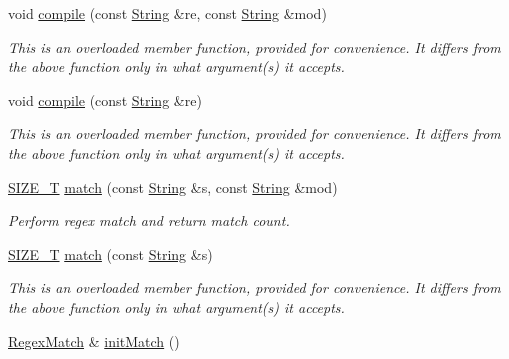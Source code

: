 \begin{DoxyCompactItemize}
void \hyperlink{classjpcre2_1_1Regex_acd49e856009160c622e90b81b6557d8d_acd49e856009160c622e90b81b6557d8d}{compile} (const \hyperlink{namespacejpcre2_a91f03070152fb228bc116c5a737f1d16}{String} \&re, const \hyperlink{namespacejpcre2_a91f03070152fb228bc116c5a737f1d16}{String} \&mod)
\begin{DoxyCompactList}\small\item\em This is an overloaded member function, provided for convenience. It differs from the above function only in what argument(s) it accepts. \end{DoxyCompactList}\item 
void \hyperlink{classjpcre2_1_1Regex_a81687ca434654cae776c2854c3618de0_a81687ca434654cae776c2854c3618de0}{compile} (const \hyperlink{namespacejpcre2_a91f03070152fb228bc116c5a737f1d16}{String} \&re)
\begin{DoxyCompactList}\small\item\em This is an overloaded member function, provided for convenience. It differs from the above function only in what argument(s) it accepts. \end{DoxyCompactList}\item 
\hyperlink{namespacejpcre2_a2aac465ddcb123560c7c8215dd69246c}{S\+I\+Z\+E\+\_\+T} \hyperlink{classjpcre2_1_1Regex_ab93775a93a0a537d09b9e9ab4a5a3894_ab93775a93a0a537d09b9e9ab4a5a3894}{match} (const \hyperlink{namespacejpcre2_a91f03070152fb228bc116c5a737f1d16}{String} \&s, const \hyperlink{namespacejpcre2_a91f03070152fb228bc116c5a737f1d16}{String} \&mod)
\begin{DoxyCompactList}\small\item\em Perform regex match and return match count. \end{DoxyCompactList}\item 
\hyperlink{namespacejpcre2_a2aac465ddcb123560c7c8215dd69246c}{S\+I\+Z\+E\+\_\+T} \hyperlink{classjpcre2_1_1Regex_a9ffbb6aa54cb97125f1b4211bc1d09a5_a9ffbb6aa54cb97125f1b4211bc1d09a5}{match} (const \hyperlink{namespacejpcre2_a91f03070152fb228bc116c5a737f1d16}{String} \&s)
\begin{DoxyCompactList}\small\item\em This is an overloaded member function, provided for convenience. It differs from the above function only in what argument(s) it accepts. \end{DoxyCompactList}\item 
\hyperlink{classjpcre2_1_1RegexMatch}{Regex\+Match} \& \hyperlink{classjpcre2_1_1Regex_a519b0915bf1163c6ce6a4d674b30cfcd_a519b0915bf1163c6ce6a4d674b30cfcd}{init\+Match} ()

\end{DoxyCompactItemize}

